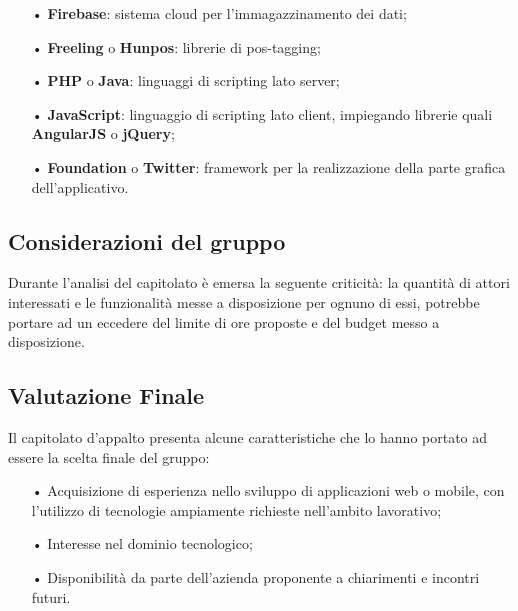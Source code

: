 \begin{itemize}
\item[•] \textbf{Firebase}: sistema cloud per l'immagazzinamento dei dati;

\item[•] \textbf{Freeling} o \textbf{Hunpos}: librerie di pos-tagging;

\item[•] \textbf{PHP} o \textbf{Java}: linguaggi di scripting lato server;

\item[•] \textbf{JavaScript}: linguaggio di scripting lato client, impiegando librerie quali \textbf{AngularJS} o \textbf{jQuery};

\item[•] \textbf{Foundation} o \textbf{Twitter}: framework per la realizzazione della parte grafica dell’applicativo.

\end{itemize}

\subsection{Considerazioni del gruppo}
Durante l’analisi del capitolato è emersa la seguente criticità:
la quantità di attori interessati e le funzionalità messe a disposizione per ognuno di essi, potrebbe portare ad un eccedere del limite di ore proposte e del budget messo a disposizione.

\subsection{Valutazione Finale}

Il capitolato d’appalto presenta alcune caratteristiche che lo hanno portato ad essere
la scelta finale del gruppo:
\begin{itemize}
\item[•] Acquisizione di esperienza nello sviluppo di applicazioni web o mobile, con l’utilizzo di tecnologie
ampiamente richieste nell’ambito lavorativo;
\item[•] Interesse nel dominio tecnologico;
\item[•] Disponibilità da parte dell'azienda proponente a chiarimenti e incontri futuri. 

\end{itemize}


